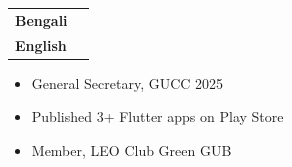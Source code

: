 %
%
%

\twocolumnsection
{
\begin{tabular}{ll}
	\textbf{Bengali} & {\color{accentcolor}\faCircle \enspace \faCircle \enspace \faCircle \enspace \faCircle \enspace \faCircle} \\
	\textbf{English} & {\color{accentcolor}\faCircle \enspace \faCircle \enspace \faCircle \enspace \faCircle \enspace \faCircleThin} \\
\end{tabular}}
{
\vspace{1em}
\begin{itemize}
	\item General Secretary, GUCC 2025
	\item Published 3+ Flutter apps on Play Store
	\item Member, LEO Club Green GUB
\end{itemize}
}
